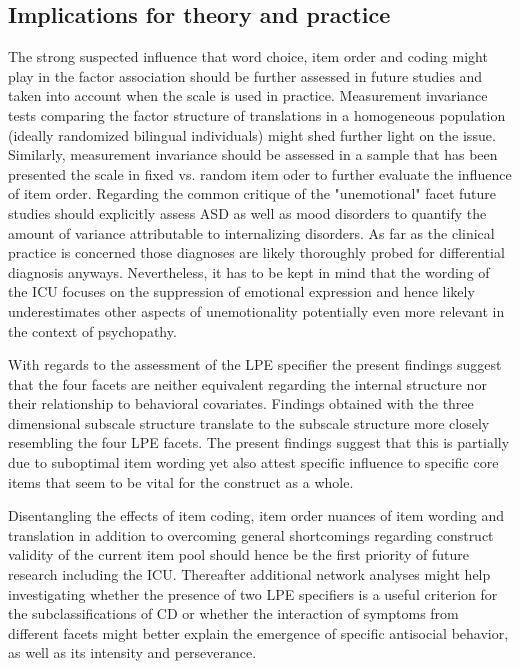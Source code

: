   \subsection{Implications for theory and practice}
 The strong suspected influence that word choice, item order and coding might play in the factor association should be further assessed in future studies and taken into account when the scale is used in practice.
 Measurement invariance tests comparing the factor structure of translations in a homogeneous population (ideally randomized bilingual individuals) might shed further light on the issue.
 Similarly, measurement invariance should be assessed in a sample that has been presented the scale in fixed vs. random item oder to further evaluate the influence of item order.
 Regarding the common critique of the "unemotional" facet  future studies should explicitly assess ASD as well as mood disorders to quantify the amount of variance attributable to internalizing disorders.
 As far as the clinical practice is concerned those diagnoses are likely thoroughly probed for differential diagnosis anyways. 
 Nevertheless, it has to be kept in mind that the wording of the ICU focuses on the suppression of emotional expression and hence likely underestimates other aspects of unemotionality potentially even more relevant in the context of psychopathy.
 
 With regards to the assessment of the LPE specifier the present findings suggest that the four facets are neither equivalent regarding the internal structure nor their relationship to behavioral covariates. Findings obtained with the three dimensional subscale structure translate to the subscale structure more closely resembling the four LPE facets.
 The present findings suggest that this is partially due to suboptimal item wording yet also attest specific influence to specific core items that seem to be vital for the construct as a whole.
 
 Disentangling the effects of item coding, item order nuances of item wording and translation in addition to overcoming general shortcomings regarding construct validity of the current item pool should hence be the first priority of future research including the ICU. 
 Thereafter additional network analyses might help investigating whether the presence of two LPE specifiers is a useful criterion for the subclassifications of CD or whether the interaction of symptoms from different facets might better explain the emergence of specific antisocial behavior, as well as its intensity and perseverance.   
 
